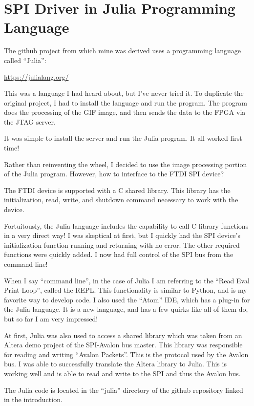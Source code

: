 \section{SPI Driver in Julia Programming Language}

The github project from which mine was derived uses a programming language called ``Julia'':

\url{https://julialang.org/}

This was a language I had heard about, but I've never tried it.
To duplicate the original project, I had to install the language and run the program.
The program does the processing of the GIF image, and then sends the data to the FPGA
via the JTAG server.

It was simple to install the server and run the Julia program.  It all worked first time!

Rather than reinventing the wheel, I decided to use the image processing portion of the Julia program.
However, how to interface to the FTDI SPI device?

The FTDI device is supported with a C shared library.  This library has the initialization, read, write, and shutdown
command necessary to work with the device.

Fortuitously, the Julia language includes the capability to call C library functions in a very direct way!
I was skeptical at first, but I quickly had the SPI device's initialization function running and returning with no error.
The other required functions were quickly added.  I now had full control of the SPI bus from the command line!

When I say ``command line'', in the case of Julia I am referring to the ``Read Eval Print Loop'', called the REPL.  This functionality is similar to Python, and is my favorite way to develop code.  I also used the ``Atom'' IDE, which has a plug-in for the Julia language.
It is a new language, and has a few quirks like all of them do, but so far I am very impressed!

At first, Julia was also used to access a shared library which was taken from an Altera demo project of the SPI-Avalon bus master.
This library was responsible for reading and writing ``Avalon Packets''.  This is the protocol used by the Avalon bus.  I was able to successfully translate the Altera library to Julia.  This is working well and is able to read and write to the SPI and thus the Avalon bus.

The Julia code is located in the ``julia'' directory of the github repository linked in the introduction.